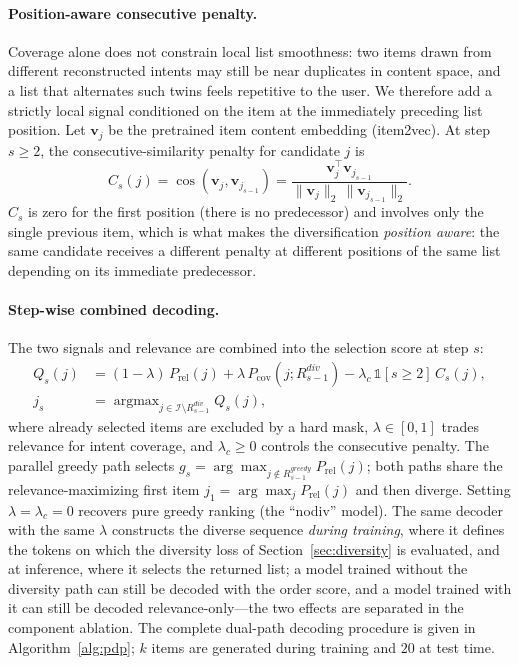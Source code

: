 \paragraph{Position-aware consecutive penalty.}
Coverage alone does not constrain local list smoothness: two items drawn from different reconstructed intents may still be near duplicates in content space, and a list that alternates such twins feels repetitive to the user. We therefore add a strictly local signal conditioned on the item at the immediately preceding list position. Let $\mathbf{v}_j$ be the pretrained item content embedding (item2vec). At step $s \geq 2$, the consecutive-similarity penalty for candidate $j$ is
\begin{equation}
\label{eq:consec_score}
C_s(j)
 = \cos(\mathbf{v}_j, \mathbf{v}_{j_{s-1}})
 = \frac{\mathbf{v}_j^\top \mathbf{v}_{j_{s-1}}}
        {\lVert \mathbf{v}_j \rVert_2\, \lVert \mathbf{v}_{j_{s-1}} \rVert_2}.
\end{equation}
$C_s$ is zero for the first position (there is no predecessor) and involves only the single previous item, which is what makes the diversification \emph{position aware}: the same candidate receives a different penalty at different positions of the same list depending on its immediate predecessor.

\paragraph{Step-wise combined decoding.}
The two signals and relevance are combined into the selection score at step $s$:
\begin{equation}
\label{eq:gen_score}
\begin{aligned}
Q_s(j)
 &= (1-\lambda)\, P_{\mathrm{rel}}(j)
  + \lambda\, P_{\mathrm{cov}}(j; R^{div}_{s-1})
  - \lambda_c\, \mathbb{1}[s \geq 2]\, C_s(j),\\
j_s &= \mathop{\arg\max}_{j \in \mathcal{I} \setminus R^{div}_{s-1}} Q_s(j),
\end{aligned}
\end{equation}
where already selected items are excluded by a hard mask, $\lambda \in [0,1]$ trades relevance for intent coverage, and $\lambda_c \geq 0$ controls the consecutive penalty. The parallel greedy path selects $g_s = \arg\max_{j \notin R^{greedy}_{s-1}} P_{\mathrm{rel}}(j)$; both paths share the relevance-maximizing first item $j_1 = \arg\max_j P_{\mathrm{rel}}(j)$ and then diverge. Setting $\lambda = \lambda_c = 0$ recovers pure greedy ranking (the ``nodiv'' model). The same decoder with the same $\lambda$ constructs the diverse sequence \emph{during training}, where it defines the tokens on which the diversity loss of Section~\ref{sec:diversity} is evaluated, and at inference, where it selects the returned list; a model trained without the diversity path can still be decoded with the order score, and a model trained with it can still be decoded relevance-only---the two effects are separated in the component ablation. The complete dual-path decoding procedure is given in Algorithm~\ref{alg:pdp}; $k$ items are generated during training and $20$ at test time.

